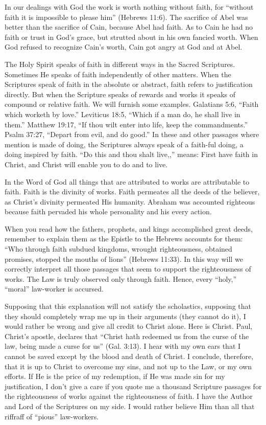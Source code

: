 In our dealings with God the work is worth nothing without faith, for “without faith it is impossible to please him” (Hebrews 11:6). The sacrifice of Abel was better than the sacrifice of Cain, because Abel had faith. As to Cain he had no faith or trust in God’s grace, but strutted about in his own fancied worth. When God refused to recognize Cain’s worth, Cain got angry at God and at Abel.

The Holy Spirit speaks of faith in different ways in the Sacred Scriptures. Sometimes He speaks of faith independently of other matters. When the Scriptures speak of faith in the absolute or abstract, faith refers to justification directly. But when the Scripture speaks of rewards and works it speaks of compound or relative faith. We will furnish some examples. Galatians 5:6, “Faith which worketh by love.” Leviticus 18:5, “Which if a man do, he shall live in them.” Matthew 19:17, “If thou wilt enter into life, keep the commandments.” Psalm 37:27, “Depart from evil, and do good.” In these and other passages where mention is made of doing, the Scriptures always speak of a faith-ful doing, a doing inspired by faith. “Do this and thou shalt live,,” means: First have faith in Christ, and Christ will enable you to do and to live.

In the Word of God all things that are attributed to works are attributable to faith. Faith is the divinity of works. Faith permeates all the deeds of the believer, as Christ’s divinity permeated His humanity. Abraham was accounted righteous because faith pervaded his whole personality and his every action.

When you read how the fathers, prophets, and kings accomplished great deeds, remember to explain them as the Epistle to the Hebrews accounts for them: “Who through faith subdued kingdoms, wrought righteousness, obtained promises, stopped the mouths of lions” (Hebrews 11:33). In this way will we correctly interpret all those passages that seem to support the righteousness of works. The Law is truly observed only through faith. Hence, every “holy,” “moral” law-worker is accursed.

Supposing that this explanation will not satisfy the scholastics, supposing that they should completely wrap me up in their arguments (they cannot do it), I would rather be wrong and give all credit to Christ alone. Here is Christ. Paul, Christ’s apostle, declares that “Christ hath redeemed us from the curse of the law, being made a curse for us” (Gal. 3:13). I hear with my own ears that I cannot be saved except by the blood and death of Christ. I conclude, therefore, that it is up to Christ to overcome my sins, and not up to the Law, or my own efforts. If He is the price of my redemption, if He was made sin for my justification, I don’t give a care if you quote me a thousand Scripture passages for the righteousness of works against the righteousness of faith. I have the Author and Lord of the Scriptures on my side. I would rather believe Him than all that riffraff of “pious” law-workers.

